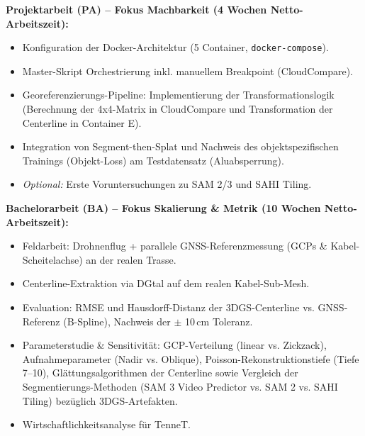 \documentclass[12pt,a4paper]{article}
\begin{document}
\noindent\textbf{Projektarbeit (PA) -- Fokus Machbarkeit (4 Wochen Netto-Arbeitszeit):}
\begin{itemize}[noitemsep]
    \item Konfiguration der Docker-Architektur (5 Container, \texttt{docker-compose}).
    \item Master-Skript Orchestrierung inkl. manuellem Breakpoint (CloudCompare).
    \item Georeferenzierungs-Pipeline: Implementierung der Transformationslogik (Berechnung der 4x4-Matrix in CloudCompare und Transformation der Centerline in Container E).
    \item Integration von Segment-then-Splat und Nachweis des objektspezifischen Trainings (Objekt-Loss) am Testdatensatz (Aluabsperrung).
    \item \textit{Optional:} Erste Voruntersuchungen zu SAM 2/3 und SAHI Tiling.
\end{itemize}

\noindent\textbf{Bachelorarbeit (BA) -- Fokus Skalierung \& Metrik (10 Wochen Netto-Arbeitszeit):}
\begin{itemize}[noitemsep]
    \item Feldarbeit: Drohnenflug + parallele GNSS-Referenzmessung (GCPs \& Kabel-Scheitelachse) an der realen Trasse.
    \item Centerline-Extraktion via DGtal auf dem realen Kabel-Sub-Mesh.
    \item Evaluation: RMSE und Hausdorff-Distanz der 3DGS-Centerline vs. GNSS-Referenz (B-Spline), Nachweis der $\pm$ 10\,cm Toleranz.
    \item Parameterstudie \& Sensitivität: GCP-Verteilung (linear vs. Zickzack), Aufnahmeparameter (Nadir vs. Oblique), Poisson-Rekonstruktionstiefe (Tiefe 7--10), Glättungsalgorithmen der Centerline sowie Vergleich der Segmentierungs-Methoden (SAM 3 Video Predictor vs. SAM 2 vs. SAHI Tiling) bezüglich 3DGS-Artefakten.
    \item Wirtschaftlichkeitsanalyse für TenneT.
\end{itemize}
\end{document}
